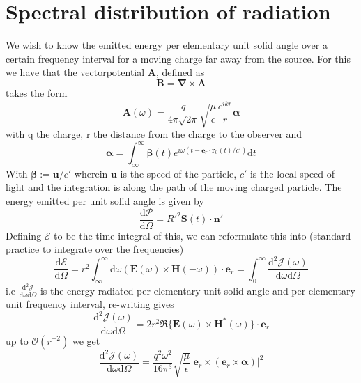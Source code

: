 \documentclass[11pt,a4paper,faculty=we,language=en,doctype=report]{cls/ugent-doc}
\begin{document}
\section{Spectral distribution of radiation}
We wish to know the emitted energy per elementary unit solid angle over a certain frequency interval for a moving charge far away from the source. For this we have that the vectorpotential $\mathbf{A}$, defined as
\begin{equation}
	\mathbf{B} = \mathbf{\nabla}\times \mathbf{A}
\end{equation}
takes the form
\begin{equation}
	\mathbf{A}(\omega) = \frac{q}{4\pi \sqrt{2\pi}} \sqrt{\frac{\mu}{\epsilon}} \frac{e^{ikr}}{r} \boldsymbol{\alpha}
\end{equation}
with q the charge, r the distance from the charge to the observer and 
\begin{equation}
	\boldsymbol{\alpha} = \int_\infty^\infty \boldsymbol{\beta}(t) e^{i\omega(t-\boldsymbol{e}_r\cdot \boldsymbol{r}_0(t)/c')}\text{d}t
\end{equation}
With $\boldsymbol{\beta}:= \boldsymbol{u}/c'$ wherein $\boldsymbol{u}$ is the speed of the particle, $c'$ is the local speed of light and the integration is along the path of the moving charged particle. 
The energy emitted per unit solid angle is given by
\begin{equation}
	\frac{\text{d} \mathscr{P}}{\text{d} \Omega} = R'^2\mathbf{S}(t)\cdot\mathbf{n}'
\end{equation}
Defining $\mathscr{E}$ to be the time integral of this, we can reformulate this into (standard practice to integrate over the frequencies)
\begin{equation}
	\frac{\text{d} \mathscr{E}}{\text{d} \Omega} = r^2\int_\infty^\infty \text{d}\omega (\mathbf{E}(\omega)\times\mathbf{H}(-\omega))\cdot\mathbf{e}_r  = \int_0^\infty \frac{\text{d}^2 \mathscr{J}(\omega)}{\text{d} \omega \text{d} \Omega}
\end{equation}
i.e $\frac{\text{d}^2 \mathscr{J}}{\text{d}\omega \text{d}\Omega}$ is the energy radiated per elementary unit solid angle and per elementary unit frequency interval, re-writing gives
\begin{equation}
	\frac{\text{d}^2 \mathscr{J}(\omega)}{\text{d} \omega \text{d} \Omega} = 2r^2 \Re\{\mathbf{E}(\omega)\times\mathbf{H}^*(\omega)\}\cdot\mathbf{e}_r 
\end{equation}
up to $\mathcal{O}(r^{-2})$ we get
\begin{equation}
	\frac{\text{d}^2 \mathscr{J}(\omega)}{\text{d} \omega \text{d} \Omega} = \frac{q^2\omega^2}{16\pi^3}\sqrt{\frac{\mu}{\epsilon}}|\mathbf{e}_r\times(\mathbf{e}_r\times\boldsymbol{\alpha})|^2\label{equation: 4.123 in elektromagnetisme}
\end{equation}
\end{document}
